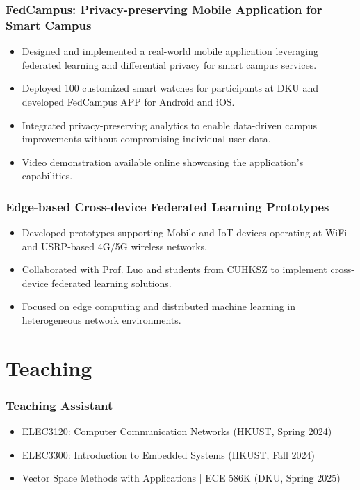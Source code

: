 \documentclass[10pt,a4paper]{article}
\begin{document}
    \subsubsection*{\color{itemcolor}FedCampus: Privacy-preserving Mobile Application for Smart Campus}
    \begin{itemize}[leftmargin=*, label=\textcolor{accentcolor}{\textbullet}]
        \item Designed and implemented a real-world mobile application leveraging federated learning and differential privacy for smart campus services.
        \item Deployed 100 customized smart watches for participants at DKU and developed FedCampus APP for Android and iOS.
        \item Integrated privacy-preserving analytics to enable data-driven campus improvements without compromising individual user data.
        \item Video demonstration available online showcasing the application's capabilities.
    \end{itemize}
    \vspace{0.6em}
    \subsubsection*{\color{itemcolor}Edge-based Cross-device Federated Learning Prototypes}
    \begin{itemize}[leftmargin=*, label=\textcolor{accentcolor}{\textbullet}]
        \item Developed prototypes supporting Mobile and IoT devices operating at WiFi and USRP-based 4G/5G wireless networks.
        \item Collaborated with Prof. Luo and students from CUHKSZ to implement cross-device federated learning solutions.
        \item Focused on edge computing and distributed machine learning in heterogeneous network environments.
    \end{itemize}
\vspace{0.8em}

\section*{\color{sectioncolor}Teaching}
    \subsubsection*{\color{itemcolor}Teaching Assistant}
    \begin{itemize}[leftmargin=*, label=\textcolor{accentcolor}{\textbullet}]
        \item ELEC3120: Computer Communication Networks (HKUST, Spring 2024)
        \item ELEC3300: Introduction to Embedded Systems (HKUST, Fall 2024)
        \item Vector Space Methods with Applications | ECE 586K (DKU, Spring 2025)
    \end{itemize}
\vspace{0.8em}
\end{document}
